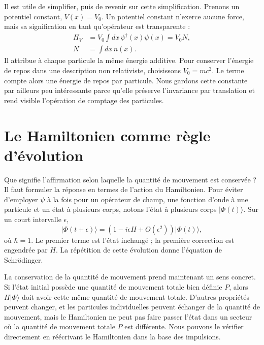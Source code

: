 Il est utile de simplifier, puis de revenir sur cette simplification. Prenons un potentiel constant, \(V(x)=V_0\). Un potentiel constant n’exerce aucune force, mais sa signification en tant qu’opérateur est transparente :
\begin{equation}
\begin{aligned}
H_V&=V_0\int dx\,\psi^\dagger(x)\psi(x)=V_0N,\\
N&=\int dx\,n(x).
\end{aligned}
\end{equation}
Il attribue à chaque particule la même énergie additive. Pour conserver l’énergie de repos dans une description non relativiste, choisissons \(V_0=mc^2\). Le terme compte alors une énergie de repos par particule. Nous gardons cette constante par ailleurs peu intéressante parce qu’elle préserve l’invariance par translation et rend visible l’opération de comptage des particules.

\section{Le Hamiltonien comme règle d’évolution}

Que signifie l’affirmation selon laquelle la quantité de mouvement est conservée ? Il faut formuler la réponse en termes de l’action du Hamiltonien. Pour éviter d’employer \(\psi\) à la fois pour un opérateur de champ, une fonction d’onde à une particule et un état à plusieurs corps, notons l’état à plusieurs corps \(\lvert\Phi(t)\rangle\). Sur un court intervalle \(\epsilon\),
\begin{equation}
\lvert\Phi(t+\epsilon)\rangle
=\left(1-i\epsilon H+O(\epsilon^2)\right)
\lvert\Phi(t)\rangle,
\label{eq:l9-short-update}
\end{equation}
où \(\hbar=1\). Le premier terme est l’état inchangé ; la première correction est engendrée par \(H\). La répétition de cette évolution donne l’équation de Schr\"odinger.

La conservation de la quantité de mouvement prend maintenant un sens concret. Si l’état initial possède une quantité de mouvement totale bien définie \(P\), alors \(H\lvert\Phi\rangle\) doit avoir cette même quantité de mouvement totale. D’autres propriétés peuvent changer, et les particules individuelles peuvent échanger de la quantité de mouvement, mais le Hamiltonien ne peut pas faire passer l’état dans un secteur où la quantité de mouvement totale \(P\) est différente. Nous pouvons le vérifier directement en réécrivant le Hamiltonien dans la base des impulsions.

